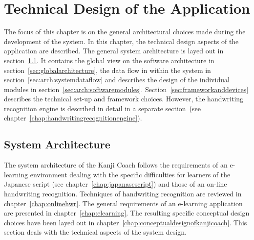 
\chapter{Technical Design of the Application}
\label{chap:technicaldesign}



The focus of this chapter is on the general architectural choices made during
the development of the system. In this chapter, the technical design aspects 
of the application are described. The general system architecture is layed out in
section~\ref{sec:systemarchitecture}. It contains the global view on the software
architecture in section~\ref{sec:globalarchitecture}, the data flow in within
the system in section~\ref{sec:arch:systemdataflow} and describes the design
of the individual modules in section~\ref{sec:arch:softwaremodules}.
Section~\ref{sec:frameworkanddevices} describes the technical set-up and 
framework choices. However, the handwriting recognition engine is described 
in detail in a separate 
section~(see chapter~\ref{chap:handwritingrecognitionengine}).

\section{System Architecture}
\label{sec:systemarchitecture}

The system architecture of the Kanji Coach follows the requirements of an 
e-learning environment dealing with the specific difficulties for learners 
of the Japanese script (see chapter~\ref{chap:japanasescript}) and those of an 
on-line handwriting recognition. Techniques of handwriting recognition are 
reviewed in chapter~\ref{chap:onlinehwr}. The general requirements of an 
e-learning application are presented in chapter~\ref{chap:elearning}. 
The resulting specific conceptual design choices have been 
layed out in chapter~\ref{chap:conceptualdesignofkanjicoach}. This
section deals with the technical aspects of the system design.

